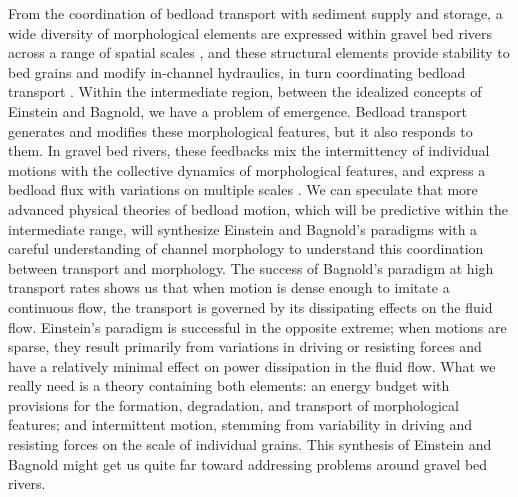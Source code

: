 \documentclass{article}
\begin{document}
From the coordination of bedload transport with sediment supply and storage, a wide diversity of morphological elements are expressed within gravel bed rivers across a range of spatial scales \citep{Brayshaw1984, Church1998, Hassan2008, Nelson2014, Venditti2017}, and these structural elements provide stability to bed grains and modify in-channel hydraulics, in turn coordinating bedload transport \citep{Laronne1976, Lisle1992, Wilcock2003a, Kasprak2014, Recking2016, Hassan2017}. 
Within the intermediate region, between the idealized concepts of Einstein and Bagnold, we have a problem of emergence.
Bedload transport generates and modifies these morphological features, but it also responds to them.  
In gravel bed rivers, these feedbacks mix the intermittency of individual motions with the collective dynamics of morphological features, and express a bedload flux with variations on multiple scales \citep{Hoey1992, Cudden2003, Nelson2010, Saletti2015, Dhont2018}. 
We can speculate that more advanced physical theories of bedload motion, which will be predictive within the intermediate range, will synthesize Einstein and Bagnold's paradigms with a careful understanding of channel morphology to understand this coordination between transport and morphology. 
The success of Bagnold's paradigm at high transport rates shows us that when motion is dense enough to imitate a continuous flow, the transport is governed by its dissipating effects on the fluid flow.
Einstein's paradigm is successful in the opposite extreme; when motions are sparse, they result primarily from variations in driving or resisting forces and have a relatively minimal effect on power dissipation in the fluid flow. 
What we really need is a theory containing both elements: an energy budget with provisions for the formation, degradation, and transport of morphological features; and intermittent motion, stemming from variability in driving and resisting forces on the scale of individual grains. 
This synthesis of Einstein and Bagnold might get us quite far toward addressing problems around gravel bed rivers. 















\end{document}
